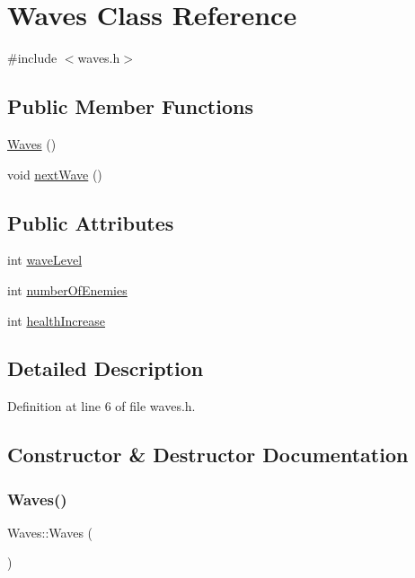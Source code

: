 \hypertarget{class_waves}{}\section{Waves Class Reference}
\label{class_waves}


{\ttfamily \#include $<$waves.\+h$>$}

\subsection*{Public Member Functions}
\begin{DoxyCompactItemize}
\item 
\hyperlink{class_waves_a9e54eb4d496902fe0d6e9a11870df970}{Waves} ()
\item 
void \hyperlink{class_waves_a1f686101089cb63743c8f50047b28716}{next\+Wave} ()
\end{DoxyCompactItemize}
\subsection*{Public Attributes}
\begin{DoxyCompactItemize}
\item 
int \hyperlink{class_waves_abfdc18a5f2f185285173797c1c67c6f9}{wave\+Level}
\item 
int \hyperlink{class_waves_a5539b3131120a19665884a63b6e9c029}{number\+Of\+Enemies}
\item 
int \hyperlink{class_waves_abefbb124b85fea1246f41390b12a0f99}{health\+Increase}
\end{DoxyCompactItemize}


\subsection{Detailed Description}


Definition at line 6 of file waves.\+h.



\subsection{Constructor \& Destructor Documentation}
\mbox{\label{class_waves_a9e54eb4d496902fe0d6e9a11870df970}} 
\subsubsection{\texorpdfstring{Waves()}{Waves()}}
{\footnotesize\ttfamily Waves\+::\+Waves (\begin{DoxyParamCaption}{ }\end{DoxyParamCaption})}



